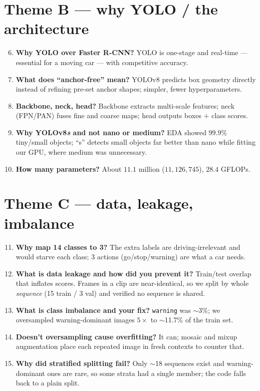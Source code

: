 \section{Theme B --- why YOLO / the architecture}
\begin{enumerate}\setcounter{enumi}{5}
  \item \textbf{Why YOLO over Faster R-CNN?} YOLO is one-stage and
        real-time --- essential for a moving car --- with competitive
        accuracy.
  \item \textbf{What does ``anchor-free'' mean?} YOLOv8 predicts box
        geometry directly instead of refining pre-set anchor shapes;
        simpler, fewer hyperparameters.
  \item \textbf{Backbone, neck, head?} Backbone extracts multi-scale
        features; neck (FPN/PAN) fuses fine and coarse maps; head outputs
        boxes $+$ class scores.
  \item \textbf{Why YOLOv8\emph{s} and not nano or medium?} EDA showed
        $99.9\%$ tiny/small objects; ``s'' detects small objects far
        better than nano while fitting our GPU, where medium was
        unnecessary.
  \item \textbf{How many parameters?} About $11.1$ million
        ($11{,}126{,}745$), $28.4$ GFLOPs.
\end{enumerate}

\section{Theme C --- data, leakage, imbalance}
\begin{enumerate}\setcounter{enumi}{10}
  \item \textbf{Why map 14 classes to 3?} The extra labels are
        driving-irrelevant and would starve each class; 3 actions
        (go/stop/warning) are what a car needs.
  \item \textbf{What is data leakage and how did you prevent it?}
        Train/test overlap that inflates scores. Frames in a clip are
        near-identical, so we split by whole \emph{sequence} (15 train /
        3 val) and verified no sequence is shared.
  \item \textbf{What is class imbalance and your fix?} \texttt{warning}
        was $\sim$3\%; we oversampled warning-dominant images $5\times$ to
        $\sim$11.7\% of the train set.
  \item \textbf{Doesn't oversampling cause overfitting?} It can; mosaic
        and mixup augmentation place each repeated image in fresh
        contexts to counter that.
  \item \textbf{Why did stratified splitting fail?} Only $\sim$18
        sequences exist and warning-dominant ones are rare, so some
        strata had a single member; the code falls back to a plain split.
\end{enumerate}

